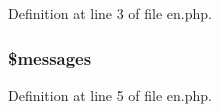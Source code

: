 Definition at line 3 of file en.\+php.

\hypertarget{en_8php_a21a183f927a6d243fe6b4ba3a6c4d4c8}{
\subsubsection[{\$messages}]{\setlength{\rightskip}{0pt plus 5cm}\$messages}}\label{en_8php_a21a183f927a6d243fe6b4ba3a6c4d4c8}


Definition at line 5 of file en.\+php.

